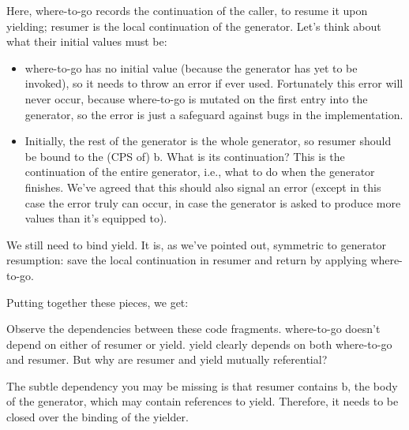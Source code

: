 Here, where-to-go records the continuation of the caller, to resume it upon
yielding; resumer is the local continuation of the generator. Let’s think about
what their initial values must be:
\begin{itemize}
  \item 
where-to-go has no initial value (because the generator has yet to be invoked),
so it needs to throw an error if ever used. Fortunately this error will never
occur, because where-to-go is mutated on the first entry into the generator, so
the error is just a safeguard against bugs in the implementation.
  \item 
Initially, the rest of the generator is the whole generator, so resumer should
be bound to the (CPS of) b. What is its continuation? This is the continuation
of the entire generator, i.e., what to do when the generator finishes. We’ve
agreed that this should also signal an error (except in this case the error
truly can occur, in case the generator is asked to produce more values than it’s
equipped to).
\end{itemize}

We still need to bind yield. It is, as we’ve pointed out, symmetric to generator
resumption: save the local continuation in resumer and return by applying
where-to-go.

Putting together these pieces, we get:


Observe the dependencies between these code fragments. where-to-go doesn’t
depend on either of resumer or yield. yield clearly depends on both where-to-go
and resumer. But why are resumer and yield mutually referential?


The subtle dependency you may be missing is that resumer contains b, the body of
the generator, which may contain references to yield. Therefore, it needs to be
closed over the binding of the yielder.

